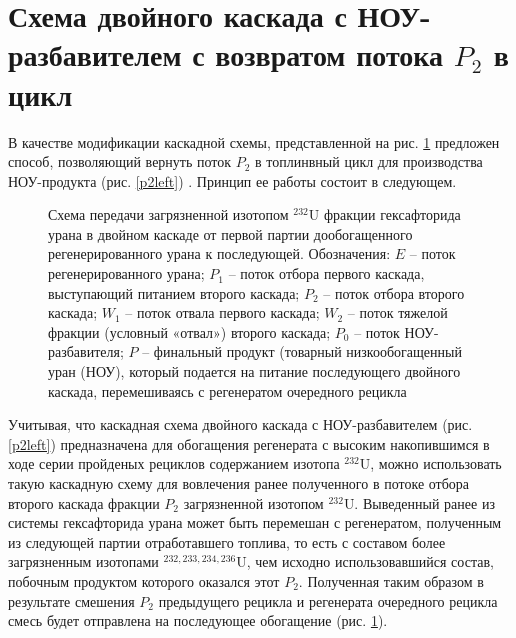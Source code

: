 \section{Схема двойного каскада с НОУ-разбавителем с возвратом потока $P_2$ в цикл}

В качестве модификации каскадной схемы, представленной на рис. \ref{P2utilizationRing} предложен способ, позволяющий вернуть поток $P_2$ в топлинвный цикл для производства НОУ-продукта (рис. \ref{p2left}) \cite{nevinicaToplivnyyCiklLegkovodnogo2019, nevinicaSposobIzotopnogoVosstanovleniya2019}. Принцип ее работы состоит в следующем.


\begin{figure}[ht]
    \caption{Схема передачи загрязненной изотопом $^{232}$U фракции гексафторида урана в двойном каскаде от первой партии дообогащенного регенерированного урана к последующей. Обозначения: $E$ -- поток регенерированного урана; $P_1$ -- поток отбора первого каскада, выступающий питанием второго каскада; $P_2$ -- поток отбора второго каскада; $W_1$ -- поток отвала первого каскада; $W_2$ -- поток тяжелой фракции (условный «отвал») второго каскада; $P_0$ -- поток НОУ-разбавителя; $P$ -- финальный продукт (товарный низкообогащенный уран (НОУ), который подается на питание последующего двойного каскада, перемешиваясь с регенератом очередного рецикла}\label{P2utilizationRing}
\end{figure}

Учитывая, что каскадная схема двойного каскада с НОУ-разбавителем (рис. \ref{p2left}) предназначена для обогащения регенерата с высоким накопившимся в ходе серии пройденых рециклов содержанием изотопа $^{232}$U, можно использовать такую каскадную схему для вовлечения ранее полученного в потоке отбора второго каскада фракции $P_2$ загрязненной изотопом $^{232}$U. Выведенный ранее из системы гексафторида урана может быть перемешан с регенератом, полученным из следующей партии отработавшего топлива, то есть с составом более загрязненным изотопами $^{232,233,234,236}$U, чем исходно использовавшийся состав, побочным продуктом которого оказался этот $P_2$. Полученная таким образом в результате смешения $P_2$ предыдущего рецикла и регенерата очередного рецикла смесь будет отправлена на последующее обогащение (рис. \ref{P2utilizationRing}).

